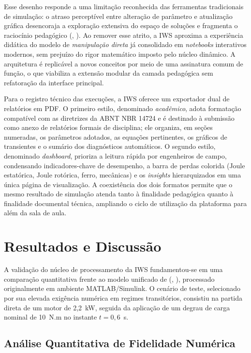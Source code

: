 \documentclass[a4paper]{ifacconf}
\begin{document}
Esse desenho responde a uma limitação reconhecida das ferramentas tradicionais de simulação: o atraso perceptível entre alteração de parâmetro e atualização gráfica desencoraja a exploração extensiva do espaço de soluções e fragmenta o raciocínio pedagógico (\citeauthor{leedy2013simulink}, \citeyear{leedy2013simulink}). Ao remover esse atrito, a IWS aproxima a experiência didática do modelo de \textit{manipulação direta} já consolidado em \textit{notebooks} interativos modernos, sem prejuízo do rigor matemático imposto pelo núcleo dinâmico. A arquitetura é replicável a novos conceitos por meio de uma assinatura comum de função, o que viabiliza a extensão modular da camada pedagógica sem refatoração da interface principal.

Para o registro técnico das execuções, a IWS oferece um exportador dual de relatórios em PDF. O primeiro estilo, denominado \textit{acadêmico}, adota formatação compatível com as diretrizes da ABNT NBR 14724 e é destinado à submissão como anexo de relatórios formais de disciplina; ele organiza, em seções numeradas, os parâmetros adotados, as equações pertinentes, os gráficos de transientes e o sumário dos diagnósticos automáticos. O segundo estilo, denominado \textit{dashboard}, prioriza a leitura rápida por engenheiros de campo, condensando indicadores-chave de desempenho, a barra de perdas colorida (Joule estatórica, Joule rotórica, ferro, mecânicas) e os \textit{insights} hierarquizados em uma única página de visualização. A coexistência dos dois formatos permite que o mesmo resultado de simulação atenda tanto à finalidade pedagógica quanto à finalidade documental técnica, ampliando o ciclo de utilização da plataforma para além da sala de aula.

\section{Resultados e Discussão}

A validação do núcleo de processamento da IWS fundamentou-se em uma comparação quantitativa frente ao modelo unificado de (\citeauthor{usta2024mathematical}, \citeyear{usta2024mathematical}), processado originalmente em ambiente MATLAB/Simulink. O cenário de teste, selecionado por sua elevada exigência numérica em regimes transitórios, consistiu na partida direta de um motor de 2,2~kW, seguida da aplicação de um degrau de carga nominal de 10~N.m no instante $t = 0,6$~s.

\subsection{Análise Quantitativa de Fidelidade Numérica}
\end{document}
